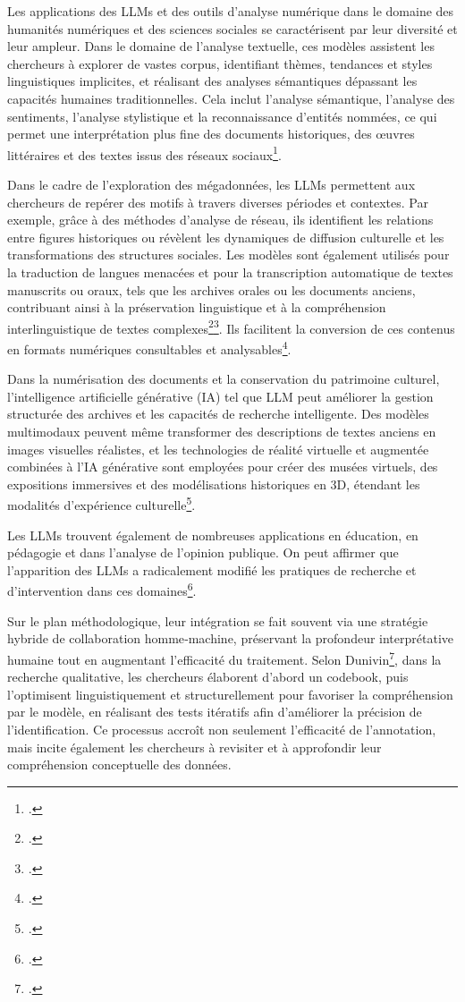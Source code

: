 \documentclass[a4paper,twoside,12pt]{book}
\begin{document}
Les applications des LLMs et des outils d'analyse numérique dans le domaine des humanités numériques et des sciences sociales se caractérisent par leur diversité et leur ampleur. Dans le domaine de l'analyse textuelle, ces modèles assistent les chercheurs à explorer de vastes corpus, identifiant thèmes, tendances et styles linguistiques implicites, et réalisant des analyses sémantiques dépassant les capacités humaines traditionnelles. Cela inclut l'analyse sémantique, l'analyse des sentiments, l'analyse stylistique et la reconnaissance d'entités nommées, ce qui permet une interprétation plus fine des documents historiques, des œuvres littéraires et des textes issus des réseaux sociaux\footcite{cigliano}.

Dans le cadre de l'exploration des mégadonnées, les LLMs permettent aux chercheurs de repérer des motifs à travers diverses périodes et contextes. Par exemple, grâce à des méthodes d'analyse de réseau, ils identifient les relations entre figures historiques ou révèlent les dynamiques de diffusion culturelle et les transformations des structures sociales. Les modèles sont également utilisés pour la traduction de langues menacées et pour la transcription automatique de textes manuscrits ou oraux, tels que les archives orales ou les documents anciens, contribuant ainsi à la préservation linguistique et à la compréhension interlinguistique de textes complexes\footcite{gu2025}\footcite{liu2024}. Ils facilitent la conversion de ces contenus en formats numériques consultables et analysables\footcite{cigliano}.

Dans la numérisation des documents et la conservation du patrimoine culturel, l'intelligence artificielle générative (IA) tel que LLM peut améliorer la gestion structurée des archives et les capacités de recherche intelligente. Des modèles multimodaux peuvent même transformer des descriptions de textes anciens en images visuelles réalistes, et les technologies de réalité virtuelle et augmentée combinées à l'IA générative sont employées pour créer des musées virtuels, des expositions immersives et des modélisations historiques en 3D, étendant les modalités d'expérience culturelle\footcite{liu2024}.

Les LLMs trouvent également de nombreuses applications en éducation, en pédagogie et dans l'analyse de l'opinion publique. On peut affirmer que l'apparition des LLMs a radicalement modifié les pratiques de recherche et d'intervention dans ces domaines\footcite{cigliano}.

Sur le plan méthodologique, leur intégration se fait souvent via une stratégie hybride de collaboration homme‑machine, préservant la profondeur interprétative humaine tout en augmentant l'efficacité du traitement. Selon Dunivin\footcite{dunivin2025}, dans la recherche qualitative, les chercheurs élaborent d'abord un codebook, puis l'optimisent linguistiquement et structurellement pour favoriser la compréhension par le modèle, en réalisant des tests itératifs afin d'améliorer la précision de l'identification. Ce processus accroît non seulement l'efficacité de l'annotation, mais incite également les chercheurs à revisiter et à approfondir leur compréhension conceptuelle des données.
\end{document}
